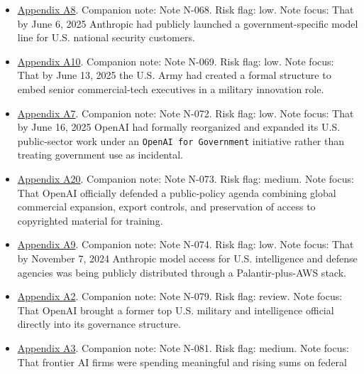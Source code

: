 \documentclass[
  american,
  11pt,
  letterpaper,
]{article}
\providecommand{\tightlist}{%
  \setlength{\itemsep}{0pt}\setlength{\parskip}{0pt}}
\begin{document}
\begin{itemize}
\tightlist
\item
  \hyperref[ch-08-appendix-a8-claude-gov-models-for-u-s-national-security-customers]{Appendix
  A8}. Companion note: Note N-068. Risk flag: low. Note focus: That by
  June 6, 2025 Anthropic had publicly launched a government-specific
  model line for U.S. national security customers.
\item
  \hyperref[ch-08-appendix-a10-army-launches-detachment-201-executive-innovation-corps-to-drive-tech-transformation]{Appendix
  A10}. Companion note: Note N-069. Risk flag: low. Note focus: That by
  June 13, 2025 the U.S. Army had created a formal structure to embed
  senior commercial-tech executives in a military innovation role.
\item
  \hyperref[ch-08-appendix-a7-introducing-openai-for-government]{Appendix
  A7}. Companion note: Note N-072. Risk flag: low. Note focus: That by
  June 16, 2025 OpenAI had formally reorganized and expanded its U.S.
  public-sector work under an \texttt{OpenAI\ for\ Government}
  initiative rather than treating government use as incidental.
\item
  \hyperref[ch-08-appendix-a20-openais-proposals-for-the-us-ai-action-plan]{Appendix
  A20}. Companion note: Note N-073. Risk flag: medium. Note focus: That
  OpenAI officially defended a public-policy agenda combining global
  commercial expansion, export controls, and preservation of access to
  copyrighted material for training.
\item
  \hyperref[ch-08-appendix-a9-anthropic-and-palantir-partner-to-bring-claude-ai-models-to-aws-for-u-s-government-intelligence-and-defense-operations]{Appendix
  A9}. Companion note: Note N-074. Risk flag: low. Note focus: That by
  November 7, 2024 Anthropic model access for U.S. intelligence and
  defense agencies was being publicly distributed through a
  Palantir-plus-AWS stack.
\item
  \hyperref[ch-08-appendix-a2-openai-appoints-former-top-us-cyberwarrior-paul-nakasone-to-its-board-of-directors]{Appendix
  A2}. Companion note: Note N-079. Risk flag: review. Note focus: That
  OpenAI brought a former top U.S. military and intelligence official
  directly into its governance structure.
\item
  \hyperref[ch-08-appendix-a3-anthropic-outspends-openai-in-biggest-ever-lobbying-quarter]{Appendix
  A3}. Companion note: Note N-081. Risk flag: medium. Note focus: That
  frontier AI firms were spending meaningful and rising sums on federal

\end{itemize}
\end{document}
